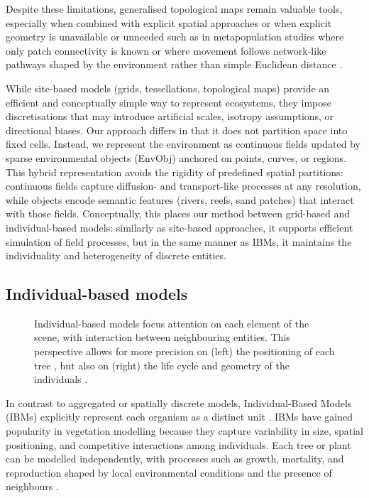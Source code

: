Despite these limitations, generalised topological maps remain valuable tools, especially when combined with explicit spatial approaches \cite{Ecormier-Nocca2021} or when explicit geometry is unavailable or unneeded such as in metapopulation studies where only patch connectivity is known \cite{Duflot2018} or where movement follows network-like pathways shaped by the environment rather than simple Euclidean distance \cite{Boussange2022,Mari2014,Carrara2012}.

\midConclusion

While site-based models (grids, tessellations, topological maps) provide an efficient and conceptually simple way to represent ecosystems, they impose discretisations that may introduce artificial scales, isotropy assumptions, or directional biases. Our approach differs in that it does not partition space into fixed cells. Instead, we represent the environment as continuous fields updated by sparse environmental objects (EnvObj) anchored on points, curves, or regions. This hybrid representation avoids the rigidity of predefined spatial partitions: continuous fields capture diffusion- and transport-like processes at any resolution, while objects encode semantic features (rivers, reefs, sand patches) that interact with those fields. Conceptually, this places our method between grid-based and individual-based models: similarly as site-based approaches, it supports efficient simulation of field processes, but in the same manner as IBMs, it maintains the individuality and heterogeneity of discrete entities.

\subsection{Individual-based models}

\begin{figure}
    \caption{Individual-based models focus attention on each element of the scene, with interaction between neighbouring entities. This perspective allows for more precision on (left) the positioning of each tree \cite{Alsweis2006}, but also on (right) the life cycle and geometry of the individuals \cite{Peytavie2024a}.}
    \label{fig:env-obj-individual-based-models}
\end{figure}

In contrast to aggregated or spatially discrete models, Individual-Based Models (IBMs) explicitly represent each organism as a distinct unit \cite{Crooks2017}. IBMs have gained popularity in vegetation modelling because they capture variability in size, spatial positioning, and competitive interactions among individuals. Each tree or plant can be modelled independently, with processes such as growth, mortality, and reproduction shaped by local environmental conditions and the presence of neighbours \cite{Chng2013,Peytavie2024a}.

